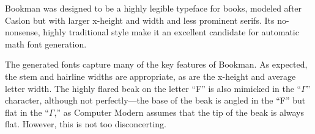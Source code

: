 
Bookman was designed to be a highly legible typeface for books, modeled after
Caslon but with larger x-height and width and less prominent serifs. Its
no-nonsense, highly traditional style make it an excellent candidate for
automatic math font generation.

The generated fonts capture many of the key features of Bookman. As expected,
the stem and hairline widths are appropriate, as are the x-height and average
letter width. The highly flared beak on the letter ``F'' is also mimicked in the
``$\Gamma$'' character, although not perfectly---the base of the beak is angled
in the ``F'' but flat in the ``$\Gamma$,'' as Computer Modern assumes that the
tip of the beak is always flat. However, this is not too disconcerting.
